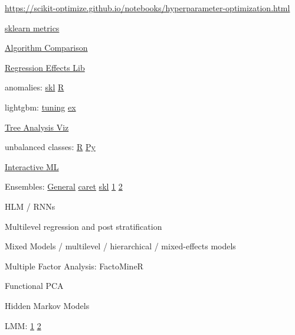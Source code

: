 \documentclass[]{book}
\begin{document}
\url{https://scikit-optimize.github.io/notebooks/hyperparameter-optimization.html}

\href{http://scikit-learn.org/stable/modules/model_evaluation.html\#function-for-prediction-error-metrics}{sklearn
metrics}

\href{https://docs.google.com/spreadsheets/d/16i47Wmjpj8k-mFRk-NnXXU5tmSQz8h37YxluDV8Zy9U/edit\#gid=0}{Algorithm
Comparison}

\href{https://www.rdocumentation.org/packages/yhat/versions/2.0-0}{Regression
Effects Lib}

anomalies:
\href{http://scikit-learn.org/stable/modules/outlier_detection.html}{skl}
\textbar{} \href{https://business-science.github.io/anomalize/}{R}

lightgbm:
\href{https://medium.com/@pushkarmandot/https-medium-com-pushkarmandot-what-is-lightgbm-how-to-implement-it-how-to-fine-tune-the-parameters-60347819b7fc}{tuning}
\textbar{}
\href{https://www.kaggle.com/ezietsman/simple-python-lightgbm-example}{ex}

\href{http://etetoolkit.org/}{Tree Analysis Viz}

unbalanced classes:
\href{https://cran.r-project.org/web/packages/imbalance/index.html}{R}
\textbar{}
\href{http://contrib.scikit-learn.org/imbalanced-learn/stable/}{Py}

\href{http://www.creativeai.net/posts/eivW6BvrrpyPf282d/interactive-machine-learning-an-overview-in-5-videos}{Interactive
ML}

Ensembles: \href{http://mlwave.com/kaggle-ensembling-guide/}{General}
\textbar{} \href{http://amunategui.github.io/blending-models/}{caret}
\textbar{}
\href{https://www.toptal.com/machine-learning/ensemble-methods-machine-learning}{skl}
\textbar{}
\href{http://blog.kaggle.com/2016/12/27/a-kagglers-guide-to-model-stacking-in-practice/}{1}
\textbar{}
\href{http://blog.kaggle.com/2017/06/15/stacking-made-easy-an-introduction-to-stacknet-by-competitions-grandmaster-marios-michailidis-kazanova/}{2}

HLM / RNNs

Multilevel regression and post stratification

Mixed Models / multilevel / hierarchical / mixed-effects models

Multiple Factor Analysis: FactoMineR

Functional PCA

Hidden Markov Models

LMM:
\href{http://edwardlib.org/tutorials/linear-mixed-effects-models}{1}
\textbar{}
\href{https://ourcodingclub.github.io/2017/03/15/mixed-models.html}{2}
\end{document}
